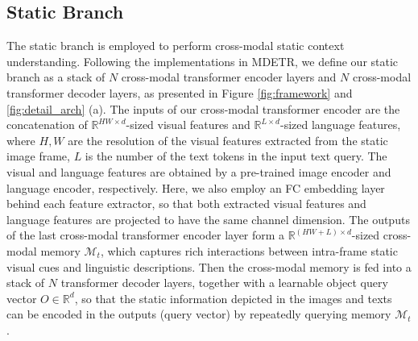 \documentclass[sigconf]{acmart}
\begin{document}
\subsection{Static Branch}
The static branch is employed to perform cross-modal static context understanding. Following the implementations in MDETR\cite{mdetr}, we define our static branch as a stack of $N$ cross-modal transformer encoder layers and $N$ cross-modal transformer decoder layers, as presented in Figure \ref{fig:framework} and \ref{fig:detail_arch} (a). The inputs of our cross-modal transformer encoder are the concatenation of $\mathbb{R}^{HW\times d}$-sized visual features and $\mathbb{R}^{L\times d}$-sized language features, where $H,W$ are the resolution of the visual features extracted from the static image frame, $L$ is the number of the text tokens in the input text query. The visual and language features are obtained by a pre-trained image encoder and language encoder\cite{roberta}, respectively. Here, we also employ an FC embedding layer behind each feature extractor, so that both extracted visual features and language features are projected to have the same channel dimension. The outputs of the last cross-modal transformer encoder layer form a $\mathbb{R}^{(HW+L)\times d}$-sized cross-modal memory $\mathcal{M}_{t}$, which captures rich interactions between intra-frame static visual cues and linguistic descriptions. Then the cross-modal memory is fed into a stack of $N$ transformer decoder layers, together with a learnable object query vector $O \in \mathbb{R}^{d}$, so that the static information depicted in the images and texts can be encoded in the outputs (query vector) by repeatedly querying memory $\mathcal{M}_{t}$.
\end{document}
